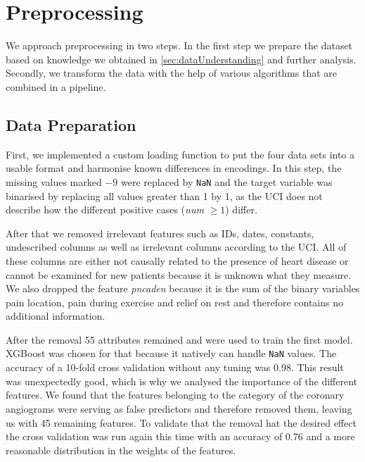 




\section{Preprocessing} \label{sec:preprocessing}

We approach preprocessing in two steps. In the first step we prepare the dataset based on knowledge we obtained in \cref{sec:dataUnderstanding} and further analysis. 
Secondly, we transform the data with the help of various algorithms that are combined in a pipeline. 

\subsection{Data Preparation }
First, we implemented a custom loading function to put the four data sets into a usable format and harmonise known differences in encodings. In this step, the missing values marked \texttt{$-9$} were replaced by \texttt{NaN} and the target variable was binarised by replacing all values greater than 1 by 1, as the UCI does not describe how the different positive cases (\textit{num} $\geq 1$) differ.

After that we removed irrelevant features such as IDs, dates, constants, undescribed columns as well as irrelevant columns according to the UCI. All of these columns are either not causally related to the presence of heart disease or cannot be examined for new patients because it is unknown what they measure. We also dropped the feature \textit{pncaden} because it is the sum of the binary variables  pain location, pain during exercise and relief on rest and therefore contains no additional information. 

After the removal 55 attributes remained and were used to train the first model. XGBoost was chosen for that because it natively can handle \texttt{NaN} values. The accuracy of a 10-fold cross validation without any tuning was 0.98. This result was unexpectedly good, which is why we analysed the importance of the different features. We found that the features belonging to the category of the coronary angiograms were serving as false predictors and therefore removed them, leaving us with 45 remaining features. To validate that the removal hat the desired effect the cross validation was run again this time with an accuracy of 0.76 and a more reasonable distribution in the weights of the features.   

